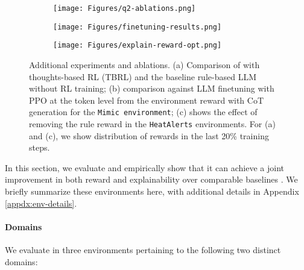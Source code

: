 \begin{figure*}[!th]
    \centering
    \begin{subfigure}[t]{0.34\linewidth}
        \centering
        \texttt{[image: Figures/q2-ablations.png]}
        \vskip -4pt
        \label{fig:tbrl}
    \end{subfigure}
    \begin{subfigure}[t]{0.3\linewidth}
        \centering
\texttt{[image: Figures/finetuning-results.png]}
    \vskip -4pt
 \label{fig:finetune}
    \end{subfigure}
    \begin{subfigure}[t]{0.34\linewidth}
        \centering
        \texttt{[image: Figures/explain-reward-opt.png]}
                \vskip -4pt
        \label{fig:no-rulerew}
    \end{subfigure}

    \vskip -4pt
    \caption{Additional experiments and ablations. (a) Comparison of \rbrl with thoughts-based RL (TBRL) and the baseline rule-based LLM without RL training; (b) comparison against LLM finetuning with PPO at the token level from the environment reward with CoT generation for the \texttt{Mimic environment}; (c) shows the effect of removing the rule reward in the \texttt{HeatAlerts} environments. For (a) and (c), we show distribution of rewards in the last 20\% training steps.}
    \label{fig:additional-restuls}
\end{figure*}

In this section, we evaluate \rbrl and empirically show that it can achieve a joint improvement in both reward and explainability over comparable baselines
. We briefly summarize these environments here, with additional details in Appendix \ref{appdx:env-details}.





\paragraph{Domains} We evaluate \rbrl in three environments pertaining to the following two distinct domains:

